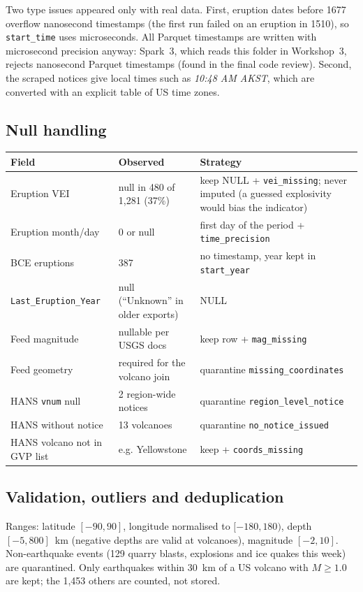 \documentclass[11pt,a4paper]{article}
\begin{document}
Two type issues appeared only with real data. First, eruption dates before 1677 overflow nanosecond timestamps (the first run failed on an eruption in 1510), so \texttt{start\_time} uses microseconds. All Parquet timestamps are written with microsecond precision anyway: Spark~3, which reads this folder in Workshop~3, rejects nanosecond Parquet timestamps (found in the final code review). Second, the scraped notices give local times such as \emph{10:48 AM AKST}, which are converted with an explicit table of US time zones.

\subsection{Null handling}
\begin{longtable}{L{3.5cm}L{4.2cm}L{6.6cm}}
\toprule
\textbf{Field} & \textbf{Observed} & \textbf{Strategy}\\
\midrule
\endhead
Eruption VEI & null in 480 of 1,281 (37\%) & keep NULL + \texttt{vei\_missing}; never imputed (a guessed explosivity would bias the indicator)\\
Eruption month/day & 0 or null & first day of the period + \texttt{time\_precision}\\
BCE eruptions & 387 & no timestamp, year kept in \texttt{start\_year}\\
\texttt{Last\_Eruption\_Year} & null (``Unknown'' in older exports) & NULL\\
Feed magnitude & nullable per USGS docs & keep row + \texttt{mag\_missing}\\
Feed geometry & required for the volcano join & quarantine \texttt{missing\_coordinates}\\
HANS \texttt{vnum} null & 2 region-wide notices & quarantine \texttt{region\_level\_notice}\\
HANS without notice & 13 volcanoes & quarantine \texttt{no\_notice\_issued}\\
HANS volcano not in GVP list & e.g. Yellowstone & keep + \texttt{coords\_missing}\\
\bottomrule
\end{longtable}

\subsection{Validation, outliers and deduplication}
Ranges: latitude $[-90,90]$, longitude normalised to $[-180,180)$, depth $[-5,800]$~km (negative depths are valid at volcanoes), magnitude $[-2,10]$. Non-earthquake events (129 quarry blasts, explosions and ice quakes this week) are quarantined. Only earthquakes within 30~km of a US volcano with $M\ge1.0$ are kept; the 1,453 others are counted, not stored.
\end{document}
